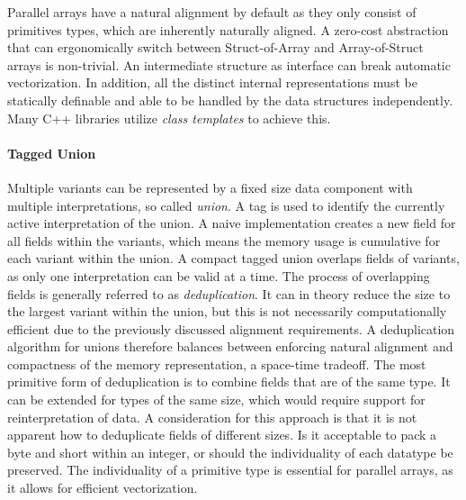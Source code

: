 \documentclass{article}
\begin{document}
Parallel arrays have a natural alignment by default as they only consist of primitives types, which are inherently naturally aligned.
A zero-cost abstraction that can ergonomically switch between Struct-of-Array and Array-of-Struct arrays is non-trivial.
An intermediate structure as interface can break automatic vectorization\cite{abstraction-vectorization}. 
In addition, all the distinct internal representations must be statically definable and able to be handled by the data structures independently.
Many C++ libraries utilize {\it class templates} to achieve this\cite{abstraction-vectorization}.

\paragraph{Tagged Union}

Multiple variants can be represented by a fixed size data component with multiple interpretations, so called {\it union}.
A tag is used to identify the currently active interpretation of the union. 
A naive implementation creates a new field for all fields within the variants, which means the memory usage is cumulative for each variant within the union. 
A compact tagged union overlaps fields of variants, as only one interpretation can be valid at a time.
The process of overlapping fields is generally referred to as {\it deduplication}.
It can in theory reduce the size to the largest variant within the union, but this is not necessarily computationally efficient due to the previously discussed alignment requirements\cite{accelerate-sum-types}.
A deduplication algorithm for unions therefore balances between enforcing natural alignment and compactness of the memory representation, a space-time tradeoff.
The most primitive form of deduplication is to combine fields that are of the same type.
It can be extended for types of the same size, which would require support for reinterpretation of data.
A consideration for this approach is that it is not apparent how to deduplicate fields of different sizes.
Is it acceptable to pack a byte and short within an integer, or should the individuality of each datatype be preserved.
The individuality of a primitive type is essential for parallel arrays, as it allows for efficient vectorization.
\end{document}
